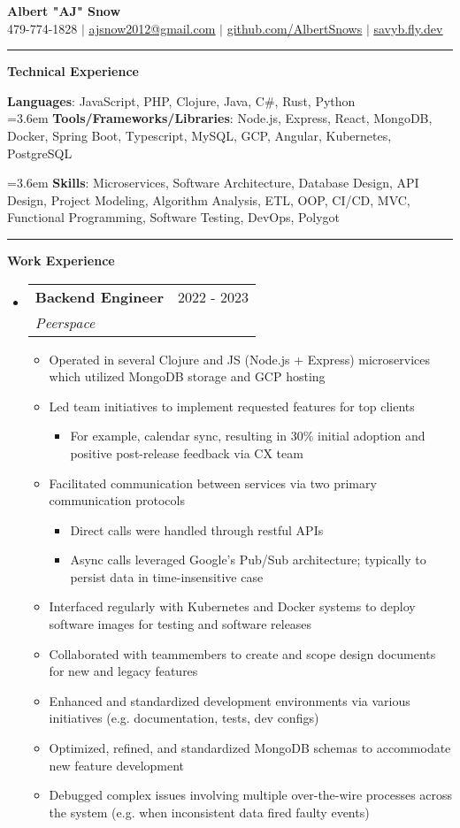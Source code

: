 \documentclass[letterpaper,11pt]{article}
\makeatletter
\newcommand{\resumeItem}[1]{
  \item\small{
    {#1 \vspace{-2pt}}
  }
}
\newcommand{\resumeSubheading}[4]{
  \vspace{-2pt}\item
    \begin{tabular*}{0.97\textwidth}[t]{l@{\extracolsep{\fill}}r}
      \textbf{#1} & #2 \\
      \textit{\small#3} & \textit{\small #4} \\
    \end{tabular*}\vspace{0pt}
}
\newcommand{\resumeSubHeadingListStart}{\begin{itemize}[leftmargin=0.15cm, label={}]}
\newcommand{\resumeSubHeadingListEnd}{\end{itemize}}
\newcommand{\resumeItemListStart}{\begin{itemize}}
\newcommand{\resumeItemListEnd}{\end{itemize}\vspace{-5pt}}
\makeatother
\begin{document}
\textbf{\normalshape \Large \textcolor{magic_blue}{Albert "AJ" Snow}} \\ \vspace{3pt}
\small 479-774-1828 $|$ \href{ mailto:ajsnow2012@gmail.com }
{\underline{ajsnow2012@gmail.com}} $|$
\href{https://github.com/AlbertSnows}{\underline{github.com/AlbertSnows}}
$|$ \href{https://savyb.fly.dev/}{\underline{savyb.fly.dev}}
\noindent\rule{19.5cm}{0.4pt}


%
\textbf{\large \textcolor{magic_blue}{Technical Experience} }
\begin{onehalfspace}

    \textbf{ Languages}{: JavaScript, PHP, Clojure, Java, 
    C\#, Rust, Python } \\

    \hangindent=3.6em
    \textbf{ Tools/Frameworks/Libraries}{: 
    Node.js, Express, React, MongoDB, Docker, Spring Boot, 
    Typescript, MySQL, GCP, Angular, Kubernetes, PostgreSQL } \\
\end{onehalfspace}

\hangindent=3.6em
\textbf{ Skills}{: }
Microservices, Software Architecture, Database Design, 
API Design, Project Modeling, Algorithm Analysis, ETL, 
OOP, CI/CD,
MVC, Functional Programming, Software Testing, DevOps, Polygot

\noindent\rule{19.5cm}{0.4pt}

\textbf{\large \textcolor{magic_blue}{Work Experience}}
\resumeSubHeadingListStart
\resumeSubheading
{Backend Engineer}{2022 - 2023}
{Peerspace}{}
\resumeItemListStart
\resumeItem{Operated in several Clojure and JS (Node.js + Express) microservices which utilized MongoDB storage and GCP hosting}
\resumeItem{ Led team initiatives to implement requested features for top clients }
\begin{itemize}
	\item For example, calendar sync, resulting in 30\% initial adoption and positive post-release feedback via CX team
\end{itemize}
\resumeItem{Facilitated communication between services via two primary communication protocols}
\begin{itemize}
	\item Direct calls were handled through restful APIs
	\item Async calls leveraged Google's Pub/Sub architecture; typically to persist data in time-insensitive case
\end{itemize}
\resumeItem{Interfaced regularly with Kubernetes and Docker systems to deploy software images for testing and software releases}
\resumeItem{Collaborated with teammembers to create and scope design documents for new and legacy features}
\resumeItem{Enhanced and standardized development environments via various initiatives (e.g. documentation, tests, dev configs)}
\resumeItem{Optimized, refined, and standardized MongoDB schemas to accommodate new feature development}
\resumeItem{Debugged complex issues involving multiple over-the-wire processes across the system (e.g. when inconsistent data fired faulty events) }
\resumeItemListEnd
\resumeSubHeadingListEnd
\end{document}
